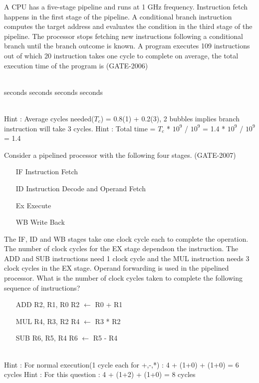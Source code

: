\begin{questyle}
  \question  A CPU has a five-stage pipeline and runs at 1 GHz frequency. Instruction fetch happens
             in the first stage of the pipeline. A conditional branch instruction computes the target
             address and evaluates the condition in the third stage of the pipeline. The processor stops
             fetching new instructions following a conditional branch until the branch outcome is known.
             A program executes 109 instructions out of which 20%
             instruction takes one cycle to complete on average, the total execution time of the program is  (GATE-2006)
  \begin{oneparchoices} \\
     seconds
     seconds
     seconds
     seconds
  \end{oneparchoices}\\
  Hint : Average cycles needed(\(T_c\)) = 0.8(1) + 0.2(3), 2 bubbles implies branch instruction will take 3 cycles.
  Hint : Total time = \(T_c\) * \(10^9\) / \(10^9\) = 1.4 * \(10^9\) / \(10^9\) = 1.4
\end{questyle}

\begin{questyle}
  \question  Consider a pipelined processor with the following four stages. (GATE-2007)

  \begin{enumerate}
    \item[IF] Instruction Fetch
    \item[ID] Instruction Decode and Operand Fetch
    \item[Ex] Execute
    \item[WB] Write Back
  \end{enumerate}
  The IF, ID and WB stages
  take one clock cycle each to complete the operation. The number of clock cycles for the
  EX stage dependson the instruction. The ADD and SUB instructions need 1 clock cycle and the
  MUL instruction needs 3 clock cycles in the EX stage. Operand forwarding is used in the
  pipelined processor. What is the number of clock cycles taken to complete the following
  sequence of instructions?

  \begin{enumerate}
    \item[ADD] R2, R1, R0 \qquad R2 \(\leftarrow\) R0 + R1
    \item[MUL] R4, R3, R2 \qquad R4 \(\leftarrow\) R3 * R2
    \item[SUB] R6, R5, R4 \qquad R6 \(\leftarrow\) R5 - R4
  \end{enumerate}

  \begin{oneparchoices}
  \end{oneparchoices} \\
  Hint : For normal execution(1 cycle each for +,-,*) : 4 + (1+0) + (1+0) = 6 cycles
  Hint : For this question : 4 + (1+2) + (1+0) = 8 cycles
\end{questyle}

